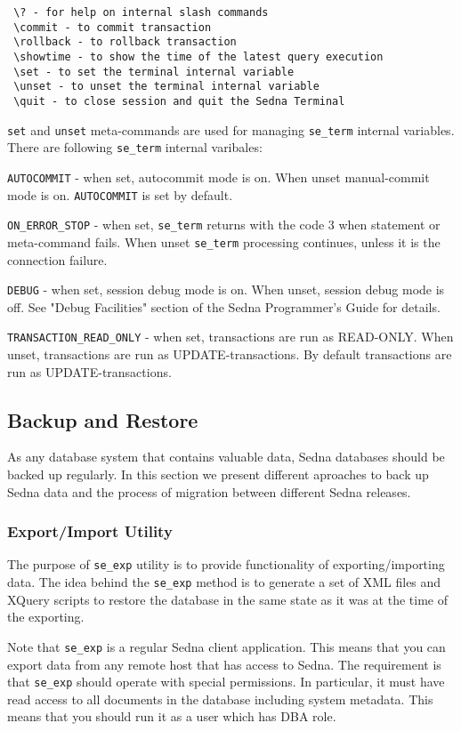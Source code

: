 \documentclass[a4paper,12pt]{article}
\begin{document}
\begin{verbatim}
 \? - for help on internal slash commands
 \commit - to commit transaction
 \rollback - to rollback transaction
 \showtime - to show the time of the latest query execution
 \set - to set the terminal internal variable
 \unset - to unset the terminal internal variable
 \quit - to close session and quit the Sedna Terminal
\end{verbatim}

\verb!set! and \verb!unset! meta-commands are used for managing \verb!se_term! internal variables. There are following \verb!se_term! internal varibales:

\verb!AUTOCOMMIT! - when set, autocommit mode is on. When unset manual-commit mode is on. \verb!AUTOCOMMIT! is set by default.

\verb!ON_ERROR_STOP! - when set, \verb!se_term! returns with the code 3 when statement or meta-command fails. When unset \verb!se_term! processing continues, unless it is the connection failure.

\verb!DEBUG! - when set, session debug mode is on. When unset, session debug mode is off. See "Debug Facilities" section of the Sedna Programmer's Guide for details.

\verb!TRANSACTION_READ_ONLY! - when set, transactions are run as READ-ONLY. When unset, transactions are run as UPDATE-transactions. By default transactions are run as UPDATE-transactions.

\subsection{Backup and Restore}

As any database system that contains valuable data, Sedna databases should be backed up regularly.
In this section we present different aproaches to back up Sedna data and the process of 
migration between different Sedna releases.


\subsubsection{Export/Import Utility}

The purpose of \verb!se_exp! utility is to provide functionality of exporting/importing data. The 
idea behind the \verb!se_exp! method is to generate a set of XML files and XQuery 
scripts to restore the database in the same state as it was at the time of the exporting. 

Note that \verb!se_exp! is a regular Sedna client application. This means that you can export data from
any remote host that has access to Sedna. The requirement is that \verb!se_exp! should operate with 
special permissions. In particular, it must have read access to all documents in the database including 
system metadata. This means that you should run it as a user which has DBA role.
\end{document}
